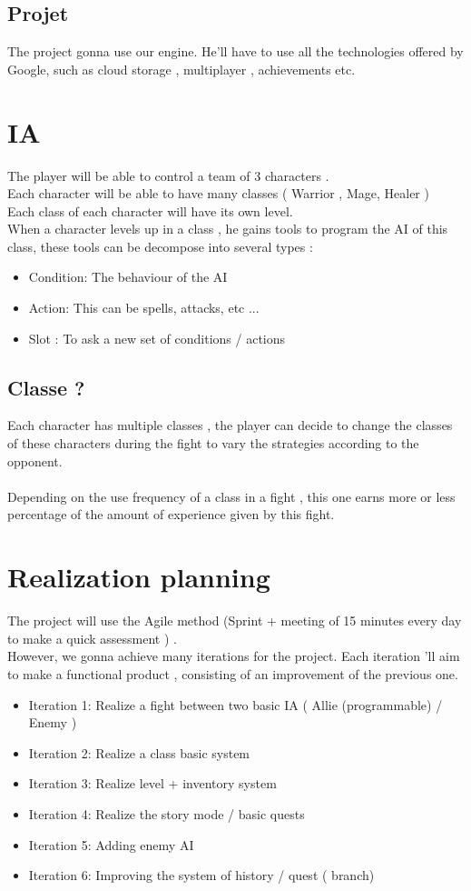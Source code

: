 \documentclass[16pt, oneside]{report}
\begin{document}
\section{Projet}
The project gonna use our engine. He'll have to use all the technologies offered by Google, such as cloud storage , multiplayer , achievements  etc.

\chapter{IA}
The player will be able to control a team of 3 characters . \\
Each character will be able to have many classes ( Warrior , Mage, Healer ) \\
Each class of each character will have its own level. \\
When a character levels up in a class , he gains tools to program the AI of this class, these tools can be decompose into several types :
\begin {itemize}
\item Condition: The behaviour of the AI
\item Action: This can be spells, attacks, etc ...
\item Slot : To ask a new set of conditions / actions
\end {itemize}

\section{Classe ?}
Each character has multiple classes , the player can decide to change the classes of these characters during the fight to vary the strategies according to the opponent.\\\\
Depending on the use frequency of a class in a fight , this one earns more or less percentage of the amount of experience given by this fight.

\chapter{Realization planning}
The project will use the Agile method (Sprint + meeting of 15 minutes every day to make a quick assessment ) . \\
However, we gonna achieve many iterations for the project. Each iteration 'll aim to make a functional product , consisting of an improvement of the previous one.\\
\begin{itemize}
\item Iteration 1: Realize a fight between two basic IA ( Allie (programmable) / Enemy )
\item Iteration 2: Realize a class basic system
\item Iteration 3: Realize level + inventory system
\item Iteration 4: Realize the story mode / basic quests
\item Iteration 5: Adding enemy AI
\item Iteration 6: Improving the system of history / quest ( branch)\\
\end{itemize}
\end{document}
